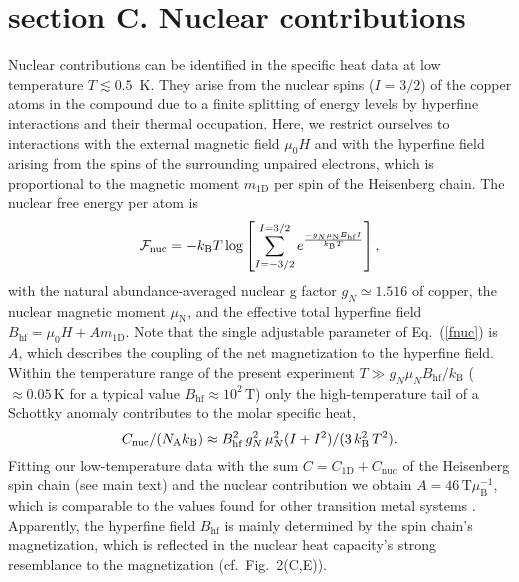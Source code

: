 \documentclass[12pt]{article}
\begin{document}
\section*{section C. Nuclear contributions}
Nuclear contributions can be identified in the specific heat data at low temperature $T\lesssim 0.5$~K. They arise from the nuclear spins ($I=3/2$) of the copper atoms in the compound due to a finite splitting of energy levels by hyperfine interactions and their thermal occupation. Here, we restrict ourselves to interactions with the external magnetic field $\mu_0H$ and with the hyperfine field arising from the spins of the surrounding unpaired electrons, which is proportional to the magnetic moment $m_\mathrm{1D}$ per spin of the Heisenberg chain. The nuclear free energy per atom is 
\begin{equation} 
\mathcal{F}_\mathrm{nuc}= -k_{\rm B}T \log\left[\sum\limits_{I=-3/2}^{I=3/2}e^\frac{-g_N \mu_\mathrm{N}B_\mathrm{hf} I}{k_\mathrm{B} T}\right],
\label{fnuc}
\end{equation}
with the natural abundance-averaged nuclear g factor $g_N\simeq 1.516$ of copper, the nuclear magnetic moment $\mu_\mathrm{N}$, and the effective total hyperfine field $B_\mathrm{hf}=\mu_0H+A m_\mathrm{1D}$. Note that the single adjustable parameter of Eq.~(\ref{fnuc}) is $A$, which describes the coupling of the net magnetization to the hyperfine field.
Within the temperature range of the present experiment
$T\gg g_N \mu_N B_\mathrm{hf} / k_\mathrm{B}$ ($\approx 0.05\,\mathrm{K}$ for a typical value $B_\mathrm{hf}\approx 10^2\,\mathrm{T}$) only the high-temperature tail of a Schottky anomaly contributes to the molar specific heat,
\begin{equation}
C_\mathrm{nuc}/(N_{\rm A}k_\mathrm{B}) \approx B_\mathrm{hf}^2\, g_N^2\, \mu_N^2  (I + I^2)/(3\, k_\mathrm{B}^2\, T^2).
\label{eq:cnuc}
\end{equation}
Fitting our low-temperature data with the sum $C=C_\mathrm{1D}+C_\mathrm{nuc}$ of the Heisenberg spin chain (see main text) and the nuclear contribution we obtain  $A= 46\, \mathrm{T}\mu_\mathrm{B}^{-1}$, which is comparable to the values found for other transition metal systems \cite{Dubiel2009}. Apparently, the hyperfine field $B_\mathrm{hf}$ is mainly determined by the spin chain's magnetization, which is reflected in the nuclear heat capacity's strong resemblance to the magnetization (cf.~Fig.~2(C,E)). 
\end{document}
